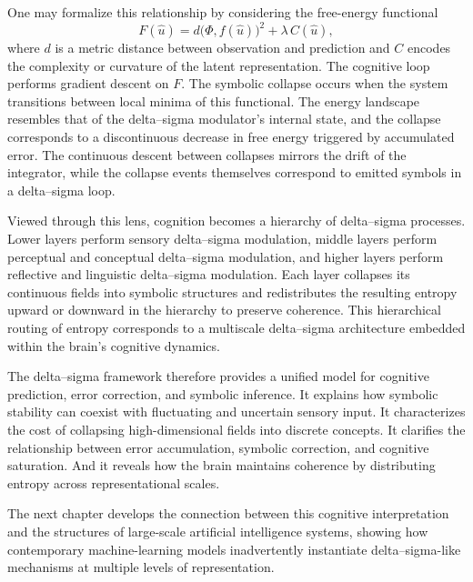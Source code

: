 One may formalize this relationship by considering the free-energy functional
\[
F(\hat{u}) = d\big(\Phi, f(\hat{u})\big)^2 + \lambda \, C(\hat{u}),
\]
where \( d \) is a metric distance between observation and prediction and \( C \) encodes the complexity or curvature of the latent representation. The cognitive loop performs gradient descent on \( F \). The symbolic collapse occurs when the system transitions between local minima of this functional. The energy landscape resembles that of the delta–sigma modulator's internal state, and the collapse corresponds to a discontinuous decrease in free energy triggered by accumulated error. The continuous descent between collapses mirrors the drift of the integrator, while the collapse events themselves correspond to emitted symbols in a delta–sigma loop.

Viewed through this lens, cognition becomes a hierarchy of delta–sigma processes. Lower layers perform sensory delta–sigma modulation, middle layers perform perceptual and conceptual delta–sigma modulation, and higher layers perform reflective and linguistic delta–sigma modulation. Each layer collapses its continuous fields into symbolic structures and redistributes the resulting entropy upward or downward in the hierarchy to preserve coherence. This hierarchical routing of entropy corresponds to a multiscale delta–sigma architecture embedded within the brain’s cognitive dynamics.

The delta–sigma framework therefore provides a unified model for cognitive prediction, error correction, and symbolic inference. It explains how symbolic stability can coexist with fluctuating and uncertain sensory input. It characterizes the cost of collapsing high-dimensional fields into discrete concepts. It clarifies the relationship between error accumulation, symbolic correction, and cognitive saturation. And it reveals how the brain maintains coherence by distributing entropy across representational scales.

The next chapter develops the connection between this cognitive interpretation and the structures of large-scale artificial intelligence systems, showing how contemporary machine-learning models inadvertently instantiate delta–sigma-like mechanisms at multiple levels of representation.


